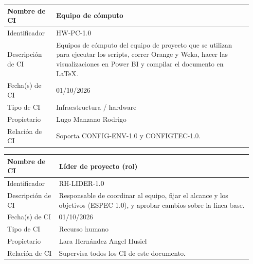 \documentclass[letterpaper,11pt]{article}
\begin{document}
\noindent\begin{minipage}{\textwidth}
\small\renewcommand{\arraystretch}{1.9}
\begin{tabularx}{\textwidth}{|p{3.3cm}|Y|}
\hline
Nombre de CI & Equipo de cómputo \\ \hline
Identificador & HW-PC-1.0 \\ \hline
Descripción de CI & Equipos de cómputo del equipo de proyecto que se utilizan para ejecutar los scripts, correr Orange y Weka, hacer las visualizaciones en Power BI y compilar el documento en LaTeX. \\ \hline
Fecha(s) de CI & 01/10/2026 \\ \hline
Tipo de CI & Infraestructura / hardware \\ \hline
Propietario & Lugo Manzano Rodrigo \\ \hline
Relación de CI & Soporta CONFIG-ENV-1.0 y CONFIGTEC-1.0. \\ \hline
\end{tabularx}
\end{minipage}\par\bigskip
\noindent\begin{minipage}{\textwidth}
\small\renewcommand{\arraystretch}{1.9}
\begin{tabularx}{\textwidth}{|p{3.3cm}|Y|}
\hline
Nombre de CI & Líder de proyecto (rol) \\ \hline
Identificador & RH-LIDER-1.0 \\ \hline
Descripción de CI & Responsable de coordinar al equipo, fijar el alcance y los objetivos (ESPEC-1.0), y aprobar cambios sobre la línea base. \\ \hline
Fecha(s) de CI & 01/10/2026 \\ \hline
Tipo de CI & Recurso humano \\ \hline
Propietario & Lara Hernández Angel Husiel \\ \hline
Relación de CI & Supervisa todos los CI de este documento. \\ \hline
\end{tabularx}
\end{minipage}\par\bigskip
\end{document}
